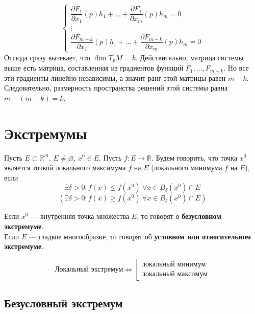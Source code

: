 \documentclass[11pt]{article}
\begin{document}
\begin{example}
    \[
\begin{cases}
\dfrac{\partial F_1}{\partial x_1}(p)h_1 + \ldots + \dfrac{\partial F_1}{\partial x_m}(p)h_m = 0 \\
\vdots \\
\dfrac{\partial F_{m-k}}{\partial x_1}(p)h_1 + \ldots + \dfrac{\partial F_{m-k}}{\partial x_m}(p)h_m = 0
\end{cases}
\]
Отсюда сразу вытекает, что $\dim T_p M = k$. Действительно, матрица системы выше есть матрица, составленная из градиентов функций $F_1, \ldots, F_{m - k}$. Но все эти градиенты линейно независимы, а значит
ранг этой матрицы равен $m - k$. Следовательно, размерность пространства решений этой системы равна $m - (m - k) = k$. 
\end{example}


\section{Экстремумы}

\begin{definition}
    Пусть $E\subset \mathbb{R}^m$, $E\neq \varnothing$, $x^0\in E$. Пусть $f \colon E\to \mathbb{R}$. 
    Будем говорить, что точка $x^0$ является точкой локального максимума $f$ на $E$ (локального минимума $f$ на $E$), если 
    \[ \exists \delta>0: f(x) \le f(x^0) \ \forall x\in B_{\delta}(x^0) \cap E \]
    \[ \left(\exists \delta>0: f(x) \ge f(x^0) \ \forall x\in B_{\delta}(x^0) \cap E\right) \]
\end{definition}

\begin{definition}
    Если $x^0$ --- внутренняя точка множества $E$, то говорят о \textbf{безусловном экстремуме}. \\
    Если $E$ --- гладкое многообразие, то говорят об \textbf{условном или относительном экстремуме}. 
\end{definition}

\begin{definition}
   \[ \text{Локальный экстремум} \iff   
   \left[
    \begin{array}{l}
        \text{локальный минимум} \\
        \text{локальный максимум}
    \end{array}
    \right. \]
\end{definition}

\subsection{Безусловный экстремум}
\end{document}
